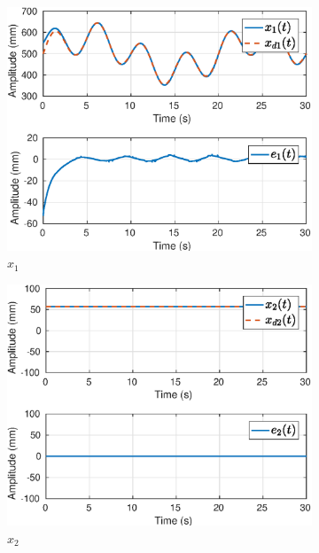 \begin{figure}[H]
\centering
\begin{subfigure}{.5\textwidth}
  \centering
  \includegraphics[width=\linewidth]{./img/traj_1_k1/x1.eps}
  \caption{$x_1$}
  \label{fig:sub1}
\end{subfigure}%
\begin{subfigure}{.5\textwidth}
  \centering
  \includegraphics[width=\linewidth]{./img/traj_1_k1/x2.eps}
  \caption{$x_2$}
  \label{fig:sub2}
\end{subfigure}
\begin{subfigure}{.5\textwidth}
  \centering

\end{subfigure}
\end{figure}
